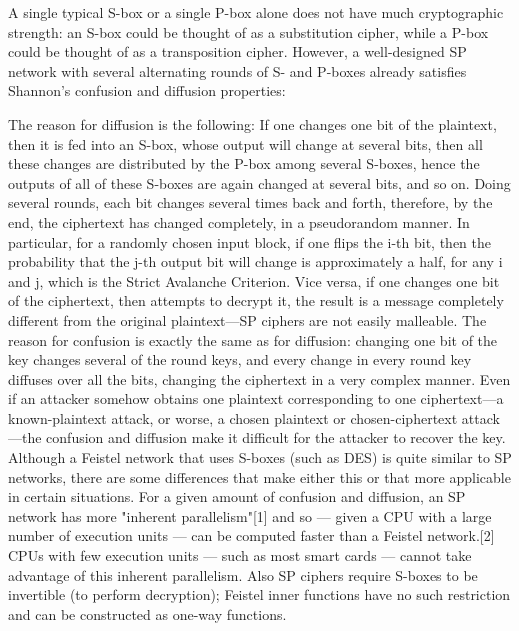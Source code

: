 \begin{definition}
A single typical S-box or a single P-box alone does not have much cryptographic strength: an S-box could be thought of as a substitution cipher, while a P-box could be thought of as a transposition cipher. However, a well-designed SP network with several alternating rounds of S- and P-boxes already satisfies Shannon's confusion and diffusion properties:

The reason for diffusion is the following: If one changes one bit of the plaintext, then it is fed into an S-box, whose output will change at several bits, then all these changes are distributed by the P-box among several S-boxes, hence the outputs of all of these S-boxes are again changed at several bits, and so on. Doing several rounds, each bit changes several times back and forth, therefore, by the end, the ciphertext has changed completely, in a pseudorandom manner. In particular, for a randomly chosen input block, if one flips the i-th bit, then the probability that the j-th output bit will change is approximately a half, for any i and j, which is the Strict Avalanche Criterion. Vice versa, if one changes one bit of the ciphertext, then attempts to decrypt it, the result is a message completely different from the original plaintext—SP ciphers are not easily malleable.
The reason for confusion is exactly the same as for diffusion: changing one bit of the key changes several of the round keys, and every change in every round key diffuses over all the bits, changing the ciphertext in a very complex manner.
Even if an attacker somehow obtains one plaintext corresponding to one ciphertext—a known-plaintext attack, or worse, a chosen plaintext or chosen-ciphertext attack—the confusion and diffusion make it difficult for the attacker to recover the key.
Although a Feistel network that uses S-boxes (such as DES) is quite similar to SP networks, there are some differences that make either this or that more applicable in certain situations. For a given amount of confusion and diffusion, an SP network has more "inherent parallelism"[1] and so — given a CPU with a large number of execution units — can be computed faster than a Feistel network.[2] CPUs with few execution units — such as most smart cards — cannot take advantage of this inherent parallelism. Also SP ciphers require S-boxes to be invertible (to perform decryption); Feistel inner functions have no such restriction and can be constructed as one-way functions.
\end{definition}

